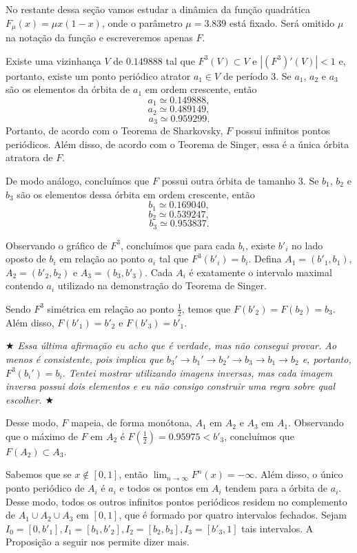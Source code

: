 No restante dessa seção vamos estudar a dinâmica da função quadrática $F_\mu(x) = \mu x(1-x)$, onde o parâmetro $\mu = 3.839$ está fixado. Será omitido $\mu$ na notação da função e escreveremos apenas $F$.

Existe uma vizinhança $V$ de $0.149888$ tal que $F^3(V) \subset V$ e $|(F^3)'(V)| < 1$ e, portanto, existe um ponto periódico atrator $a_1 \in V$ de período $3$. Se $a_1$, $a_2$ e $a_3$ são os elementos da órbita de $a_1$ em ordem crescente, então
$$a_1 \simeq 0.149888,$$
$$a_2 \simeq 0.489149,$$
$$a_3 \simeq 0.959299.$$
Portanto, de acordo com o Teorema de Sharkovsky, $F$ possui infinitos pontos periódicos. Além disso, de acordo com o Teorema de Singer, essa é a única órbita atratora de $F$.

De modo análogo, concluímos que $F$ possui outra órbita de tamanho $3$. Se $b_1$, $b_2$ e $b_3$ são os elementos dessa órbita em ordem crescente, então
$$b_1 \simeq 0.169040,$$
$$b_2 \simeq 0.539247,$$
$$b_3 \simeq 0.953837.$$

Observando o gráfico de $F^3$, concluímos que para cada $b_i$, existe $b'_i$ no lado oposto de $b_i$ em relação ao ponto $a_i$ tal que $F^3(b'_i) = b_i$. Defina $A_1 = (b'_1, b_1)$, $A_2 = (b'_2, b_2)$ e $A_3 = (b_3, b'_3)$. Cada $A_i$ é exatamente o intervalo maximal contendo $a_i$ utilizado na demonstração do Teorema de Singer.

Sendo $F^3$ simétrica em relação ao ponto $\frac{1}{2}$, temos que $F(b'_2) = F(b_2) = b_3$. Além disso, $F(b'_1) = b'_2$ e $F(b'_3) = b'_1$.

\textit{ $\bigstar$ Essa última afirmação eu acho que é verdade, mas não consegui provar. Ao menos é consistente, pois implica que $b_3' \to b_1' \to b_2' \to b_3 \to b_1 \to b_2$ e, portanto, $F^3(b_i') = b_i$. Tentei mostrar utilizando imagens inversas, mas cada imagem inversa possui dois elementos e eu não consigo construir uma regra sobre qual escolher. $\bigstar$}

Desse modo, $F$ mapeia, de forma monótona, $A_1$ em $A_2$ e $A_3$ em $A_1$. Observando que o máximo de $F$ em $A_2$ é $F \left( \frac{1}{2} \right) = 0.95975 < b'_3$, concluímos que $F(A_2) \subset A_3$.

Sabemos que se $x \notin [0, 1]$, então $\lim_{n \to \infty} F^n(x) = -\infty$. Além disso, o único ponto periódico de $A_i$ é $a_i$ e todos os pontos em $A_i$ tendem para a órbita de $a_i$. Desse modo, todos os outros infinitos pontos periódicos residem no complemento de $A_1 \cup A_2 \cup A_3$ em $[0, 1]$, que é formado por quatro intervalos fechados. Sejam $I_0 = [0, b'_1], I_1 = [b_1, b'_2], I_2 = [b_2, b_3], I_3 = [b'_3, 1]$ tais intervalos. A Proposição a seguir nos permite dizer mais.

